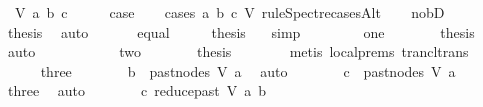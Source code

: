\begin{isabellebody}
\ {\isacharparenleft}{\kern0pt}{}\ V\ a\ b\ c{\isacharparenright}{\kern0pt}\isanewline
\ \ \isamarkupfalse%
\ \isamarkupfalse%
\ {\isacharquery}{\kern0pt}case\ \isanewline
\ \ \isamarkupfalse%
{\isacharparenleft}{\kern0pt}cases\ a\ b\ c\ V\ rule{\isacharcolon}{\kern0pt}Spectre{\isacharunderscore}{\kern0pt}casesAlt{\isacharparenright}{\kern0pt}\isanewline
\ \ \isamarkupfalse%
\ no{\isacharunderscore}{\kern0pt}bD\isanewline
\ \ \ \ \isamarkupfalse%
\ \isamarkupfalse%
\ {\isacharquery}{\kern0pt}thesis\ \isamarkupfalse%
\ auto\isanewline
\ \ \isamarkupfalse%
\isanewline
\ \ \isamarkupfalse%
\ equal\isanewline
\ \ \isamarkupfalse%
\ \isamarkupfalse%
\ {\isacharquery}{\kern0pt}thesis\ \ \isamarkupfalse%
\ simp\isanewline
\ \ \isamarkupfalse%
\isanewline
\ \ \ \ \isamarkupfalse%
\ one\isanewline
\ \ \ \ \isamarkupfalse%
\ \isamarkupfalse%
\ {\isacharquery}{\kern0pt}thesis\ \isamarkupfalse%
\ auto\ \ \ \isanewline
\ \ \isamarkupfalse%
\isanewline
\ \ \ \ \isamarkupfalse%
\ two\isanewline
\ \ \ \ \isamarkupfalse%
\ \isamarkupfalse%
\ {\isacharquery}{\kern0pt}thesis\isanewline
\ \ \ \ \ \ \isamarkupfalse%
\ {\isacharparenleft}{\kern0pt}metis\ {\isachardoublequoteopen}local{\isachardot}{\kern0pt}{}{\isachardot}{\kern0pt}prems{\isachardoublequoteclose}\ trancl{\isacharunderscore}{\kern0pt}trans{\isacharparenright}{\kern0pt}\ \isanewline
\ \ \isamarkupfalse%
\isanewline
\ \ \ \ \isamarkupfalse%
\ three\isanewline
\ \ \ \ \isamarkupfalse%
\ \isamarkupfalse%
\ {\isachardoublequoteopen}b\ {\isasymin}\ past{\isacharunderscore}{\kern0pt}nodes\ V\ a{\isachardoublequoteclose}\ \isamarkupfalse%
\ auto\isanewline
\ \ \ \ \isamarkupfalse%
\ \isamarkupfalse%
\ {\isachardoublequoteopen}c\ {\isasymin}\ past{\isacharunderscore}{\kern0pt}nodes\ V\ a{\isachardoublequoteclose}\ \isamarkupfalse%
\ three\ \isamarkupfalse%
\ auto\isanewline
\ \ \ \ \isamarkupfalse%
\ \isamarkupfalse%
\ {\isachardoublequoteopen}c\ {\isasymrightarrow}\isactrlsup {\isacharplus}{\kern0pt}\isactrlbsub reduce{\isacharunderscore}{\kern0pt}past\ V\ a\isactrlesub \ b{\isachardoublequoteclose}\ \isamarkupfalse%

\end{isabellebody}
